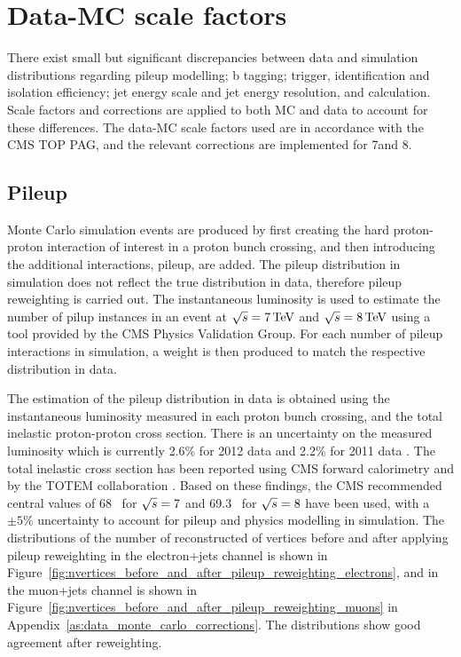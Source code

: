 \section{Data-MC scale factors}
\label{s:data_mc_scale_factors}
There exist small but significant discrepancies between data and simulation distributions regarding pileup
modelling; b tagging; trigger, identification and isolation efficiency; jet energy scale and jet energy
resolution, and \met calculation. Scale factors and corrections are applied to both MC and data to account for
these differences. The data-MC scale factors used are in accordance with the CMS TOP PAG, and the relevant
corrections are implemented for 7\TeV and 8\TeV.

\subsection{Pileup}
\label{ss:pileup}
Monte Carlo simulation events are produced by first creating the hard proton-proton interaction of interest in
a proton bunch crossing, and then introducing the additional interactions, pileup, are added. The pileup
distribution in simulation does not reflect the true distribution in data, therefore pileup reweighting is
carried out. The instantaneous luminosity is used to estimate the number of pilup instances in an event at
$\sqrt{s}=7\,\text{Te\hspace{-.08em}V}$ and $\sqrt{s}=8\,\text{Te\hspace{-.08em}V}$ using a tool provided by the CMS Physics Validation Group. For each number
of pileup interactions in simulation, a weight is then produced to match the respective distribution in data.

The estimation of the pileup distribution in data is obtained using the instantaneous luminosity measured in
each proton bunch crossing, and the total inelastic proton-proton cross section. There is an uncertainty on
the measured luminosity which is currently 2.6\% for 2012 data \cite{CMS:2013gfa} and 2.2\% for 2011 data
\cite{CMS:2012eui}. The total inelastic cross section has been reported using CMS forward calorimetry
\cite{Chatrchyan:2012gwa} and by the TOTEM collaboration \cite{Antchev:2011vs}. Based on these findings, the
CMS recommended central values of 68\mb~ for $\sqrt{s}=7$ and 69.3\mb~ for $\sqrt{s}=8$ have been used, with a
$\pm5\%$ uncertainty to account for pileup and physics modelling in simulation. The distributions of the
number of reconstructed of vertices before and after applying pileup reweighting in the electron+jets channel
is shown in Figure~\ref{fig:nvertices_before_and_after_pileup_reweighting_electrons}, and in the muon+jets
channel is shown in Figure~\ref{fig:nvertices_before_and_after_pileup_reweighting_muons} in Appendix~\ref{as:data_monte_carlo_corrections}.
The distributions show good agreement after reweighting.

